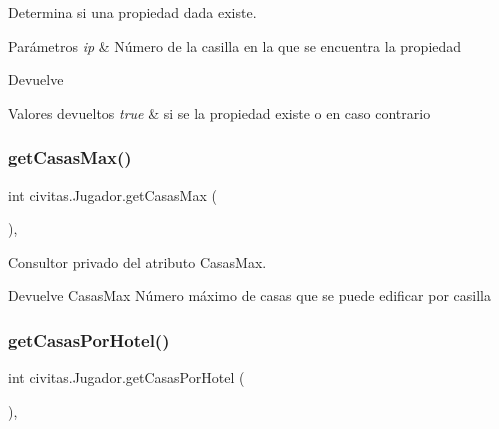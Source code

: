 Determina si una propiedad dada existe. 
\begin{DoxyParams}{Parámetros}
{\em ip} & Número de la casilla en la que se encuentra la propiedad \\
\hline
\end{DoxyParams}
\begin{DoxyReturn}{Devuelve}

\end{DoxyReturn}

\begin{DoxyRetVals}{Valores devueltos}
{\em true} & si se la propiedad existe o  en caso contrario \\
\hline
\end{DoxyRetVals}
\mbox{\label{classcivitas_1_1Jugador_a53bb212c80e5478ee456aac4e80c3aca}} 
\subsubsection{\texorpdfstring{get\+Casas\+Max()}{getCasasMax()}}
{\footnotesize\ttfamily int civitas.\+Jugador.\+get\+Casas\+Max (\begin{DoxyParamCaption}{ }\end{DoxyParamCaption})\hspace{0.3cm}{\ttfamily [inline]}, {\ttfamily [private]}}

Consultor privado del atributo Casas\+Max. \begin{DoxyReturn}{Devuelve}
Casas\+Max Número máximo de casas que se puede edificar por casilla 
\end{DoxyReturn}
\mbox{\label{classcivitas_1_1Jugador_a0fd044d8f7c6d61718b389124f93ec17}} 
\subsubsection{\texorpdfstring{get\+Casas\+Por\+Hotel()}{getCasasPorHotel()}}
{\footnotesize\ttfamily int civitas.\+Jugador.\+get\+Casas\+Por\+Hotel (\begin{DoxyParamCaption}{ }\end{DoxyParamCaption})\hspace{0.3cm}{\ttfamily [inline]}, {\ttfamily [package]}}

